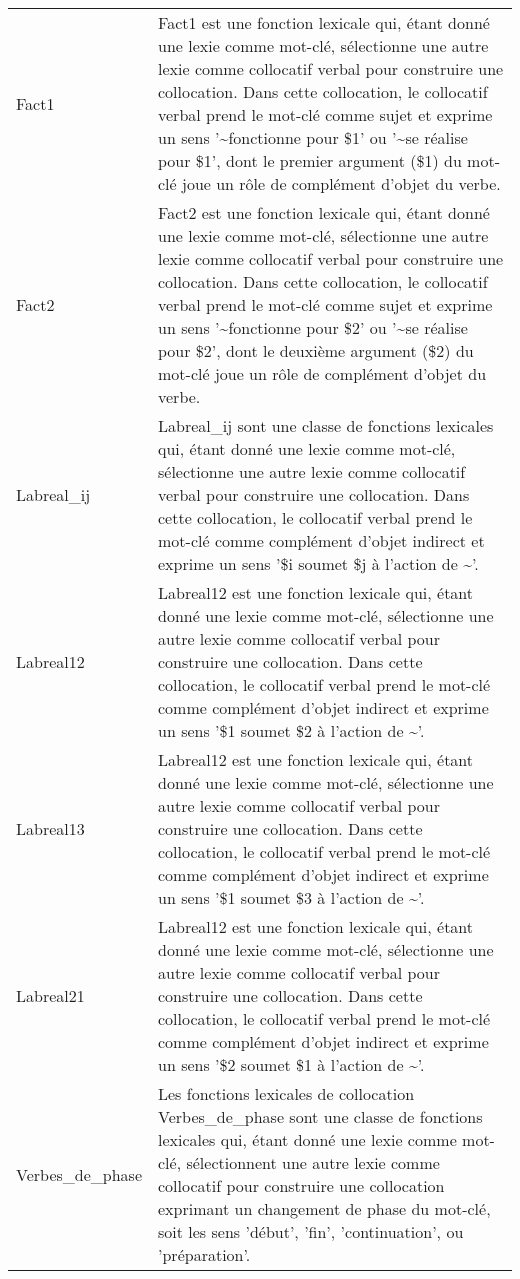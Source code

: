 \begin{longtable}{ll}
Fact1 & Fact1 est une fonction lexicale qui, étant donné une lexie comme mot-clé, sélectionne une autre lexie comme collocatif verbal pour construire une collocation. Dans cette collocation, le collocatif verbal prend le mot-clé comme sujet et exprime un sens '\textasciitilde \space fonctionne pour \$1' ou '\textasciitilde \space se réalise pour \$1', dont le premier argument (\$1) du mot-clé joue un rôle de complément d'objet du verbe. \\
Fact2 & Fact2 est une fonction lexicale qui, étant donné une lexie comme mot-clé, sélectionne une autre lexie comme collocatif verbal pour construire une collocation. Dans cette collocation, le collocatif verbal prend le mot-clé comme sujet et exprime un sens '\textasciitilde \space fonctionne pour \$2' ou '\textasciitilde \space se réalise pour \$2', dont le deuxième argument (\$2) du mot-clé joue un rôle de complément d'objet du verbe. \\
Labreal\_ij & Labreal\_ij sont une classe de fonctions lexicales qui, étant donné une lexie comme mot-clé, sélectionne une autre lexie comme collocatif verbal pour construire une collocation. Dans cette collocation, le collocatif verbal prend le mot-clé comme complément d'objet indirect et exprime un sens '\$i soumet \$j à l'action de \textasciitilde '. \\
Labreal12 & Labreal12 est une fonction lexicale qui, étant donné une lexie comme mot-clé, sélectionne une autre lexie comme collocatif verbal pour construire une collocation. Dans cette collocation, le collocatif verbal prend le mot-clé comme complément d'objet indirect et exprime un sens '\$1 soumet \$2 à l'action de \textasciitilde '. \\
Labreal13 & Labreal12 est une fonction lexicale qui, étant donné une lexie comme mot-clé, sélectionne une autre lexie comme collocatif verbal pour construire une collocation. Dans cette collocation, le collocatif verbal prend le mot-clé comme complément d'objet indirect et exprime un sens '\$1 soumet \$3 à l'action de \textasciitilde '. \\
Labreal21 & Labreal12 est une fonction lexicale qui, étant donné une lexie comme mot-clé, sélectionne une autre lexie comme collocatif verbal pour construire une collocation. Dans cette collocation, le collocatif verbal prend le mot-clé comme complément d'objet indirect et exprime un sens '\$2 soumet \$1 à l'action de \textasciitilde '. \\
Verbes\_de\_phase & Les fonctions lexicales de collocation Verbes\_de\_phase sont une classe de fonctions lexicales qui, étant donné une lexie comme mot-clé, sélectionnent une autre lexie comme collocatif pour construire une collocation exprimant un changement de phase du mot-clé, soit les sens 'début', 'fin', 'continuation', ou 'préparation'. \\

\end{longtable}
